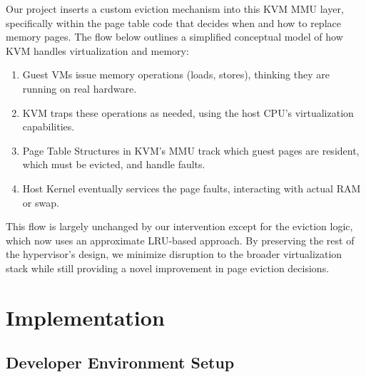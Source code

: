 \documentclass[letterpaper,twocolumn,10pt]{article}
\begin{document}
Our project inserts a custom eviction mechanism into this KVM MMU layer,
specifically within the page table code that decides when and how to replace
memory pages. The flow below outlines a simplified conceptual model of how KVM
handles virtualization and memory:

\begin{enumerate}[leftmargin=*,itemsep=2pt,topsep=2pt]
    \item Guest VMs issue memory operations (loads, stores), thinking they are
          running on real hardware.
    \item KVM traps these operations as needed, using the host CPU's
          virtualization capabilities.
    \item Page Table Structures in KVM's MMU track which guest pages are resident,
          which must be evicted, and handle faults.
    \item Host Kernel eventually services the page faults, interacting with actual
          RAM or swap.
\end{enumerate}

This flow is largely unchanged by our intervention except for the eviction logic,
which now uses an approximate LRU-based approach. By preserving the rest of the
hypervisor's design, we minimize disruption to the broader virtualization stack
while still providing a novel improvement in page eviction decisions.

\section{Implementation}

\subsection{Developer Environment Setup}
\end{document}

